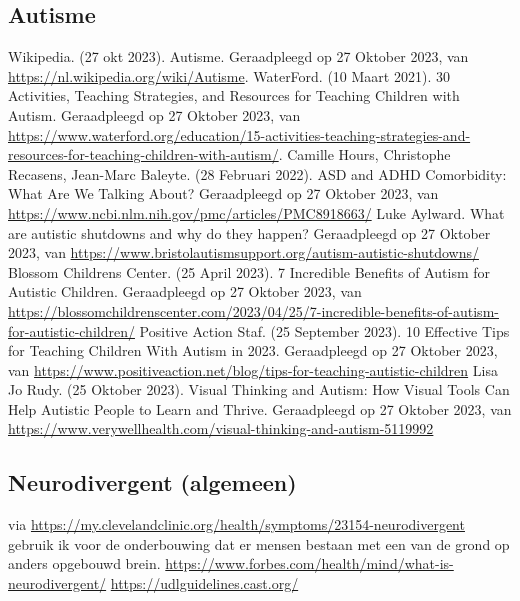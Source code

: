 \begin{thebibliography}{9}
        \item[\bigskip\subsection*{Autisme}]
                Wikipedia. (27 okt 2023). Autisme. Geraadpleegd op 27 Oktober 2023, van \url{https://nl.wikipedia.org/wiki/Autisme}.
                WaterFord. (10 Maart 2021). 30 Activities, Teaching Strategies, and Resources for Teaching Children with Autism. Geraadpleegd op 27 Oktober 2023, van \url{https://www.waterford.org/education/15-activities-teaching-strategies-and-resources-for-teaching-children-with-autism/}.
                Camille Hours, Christophe Recasens, Jean-Marc Baleyte. (28 Februari 2022). ASD and ADHD Comorbidity: What Are We Talking About? Geraadpleegd op 27 Oktober 2023, van \url{https://www.ncbi.nlm.nih.gov/pmc/articles/PMC8918663/}
                Luke Aylward. What are autistic shutdowns and why do they happen? Geraadpleegd op 27 Oktober 2023, van \url{https://www.bristolautismsupport.org/autism-autistic-shutdowns/}
                Blossom Childrens Center. (25 April 2023). 7 Incredible Benefits of Autism for Autistic Children. Geraadpleegd op 27 Oktober 2023, van \url{https://blossomchildrenscenter.com/2023/04/25/7-incredible-benefits-of-autism-for-autistic-children/}
                Positive Action Staf. (25 September 2023). 10 Effective Tips for Teaching Children With Autism in 2023. Geraadpleegd op 27 Oktober 2023, van \url{https://www.positiveaction.net/blog/tips-for-teaching-autistic-children}
                Lisa Jo Rudy. (25 Oktober 2023). Visual Thinking and Autism: How Visual Tools Can Help Autistic People to Learn and Thrive. Geraadpleegd op 27 Oktober 2023, van \url{https://www.verywellhealth.com/visual-thinking-and-autism-5119992}
        
        \item[\bigskip\subsection*{Neurodivergent (algemeen)}]
                via \url{https://my.clevelandclinic.org/health/symptoms/23154-neurodivergent} gebruik ik voor de onderbouwing dat er mensen bestaan met een van de grond op anders opgebouwd brein.
                \url{https://www.forbes.com/health/mind/what-is-neurodivergent/}
                \url{https://udlguidelines.cast.org/}
        \newpage        
                

\end{thebibliography}
